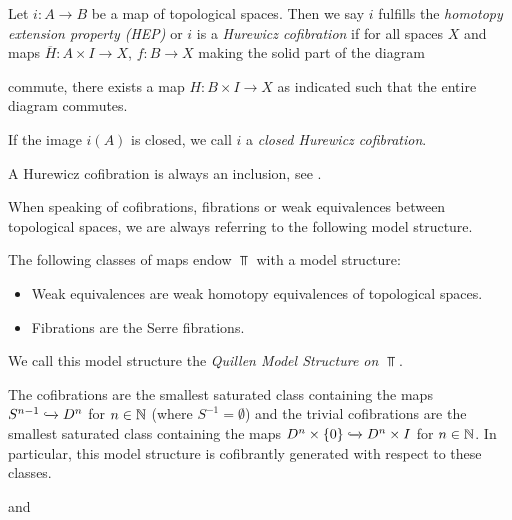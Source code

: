 \begin{definition}
    Let $i\colon A\to B$ be a map of topological spaces.
    Then we say $i$ fulfills the \emph{homotopy extension property (HEP)} or $i$ is a \emph{Hurewicz cofibration} if for all spaces $X$ and maps $\overline{H}\colon A\times I\to X$, $f\colon B\to X$ making the solid part of the diagram 
    \begin{center}
    \end{center}
    commute, there exists a map $H\colon B\times I\to X$ as indicated such that the entire diagram commutes.
    
    If the image $i(A)$ is closed, we call $i$ a \emph{closed Hurewicz cofibration}.
\end{definition}
\begin{remark}\label{rmk:hurewiczCofibIsIncl}
    A Hurewicz cofibration is always an inclusion, see \cite[Proposition 4H.1]{hatcher2002algebraic}.
\end{remark}
When speaking of cofibrations, fibrations or weak equivalences between topological spaces, we are always referring to the following model structure.
\begin{thm}
    The following classes of maps endow $\Top$ with a model structure:
    \begin{itemize}
        \item Weak equivalences are weak homotopy equivalences of topological spaces.
        \item Fibrations are the Serre fibrations.
    \end{itemize}
    We call this model structure the \emph{Quillen Model Structure on $\Top$}.
    
    The cofibrations are the smallest saturated class containing the maps $S^{n-1}\xhookrightarrow{}D^n$ for $n\in\mathbb{N}$ (where $S^{-1}=\emptyset$) and the trivial cofibrations are the smallest saturated class containing the maps $D^n\times\left\lbrace0\right\rbrace\xhookrightarrow{}D^n\times I$ for $n\in\mathbb{N}$.
    In particular, this model structure is cofibrantly generated with respect to these classes.
    \begin{reference}
        \cite[Chap. II, \S 3, Theorem 1]{Quillen1967} and \cite{hirschhorn_quillen}
    \end{reference}
\end{thm}
